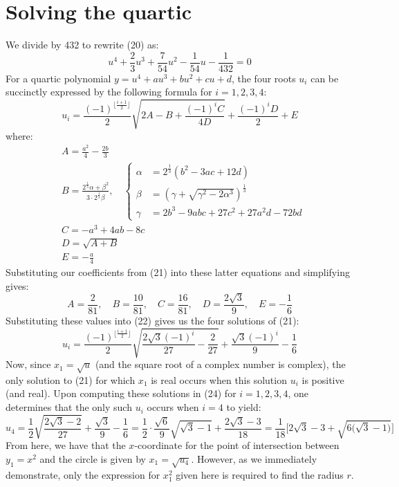 \documentclass{article}
\begin{document}
\section{Solving the quartic}
We divide by 432 to rewrite (20) as:
\begin{equation}
    \tag{21}u^4+\frac{2}{3}u^3+\frac{7}{54}u^2-\frac{1}{54}u-\frac{1}{432}=0
\end{equation}
\noindent For a quartic polynomial $y=u^4 + au^3+bu^2+cu+d$, the four roots $u_i$ can be succinctly expressed by the following formula for $i=1,2,3,4$:
\newline
\begin{equation}
  \tag{22}  u_i=\frac{(-1)^{\big\lfloor \frac{i+1}{2} \big\rfloor}}{2}\sqrt{2A-B+\frac{(-1)^iC}{4D}}+\frac{(-1)^iD}{2}+E
\end{equation}
\noindent where: 
\begin{align*}
    &A = \frac{a^2}{4} - \frac{2b}{3} \\
    &B = \frac{2^{\frac{1}{3}}\alpha + \beta^2}{3 \cdot 2^{\frac{1}{3}} \beta}, \quad
    \left\{
    \begin{aligned}
        \alpha &= 2^{\frac{1}{3}}(b^2 - 3ac + 12d) \\
        \beta &= \left(\gamma + \sqrt{\gamma^2 - 2\alpha^3}\right)^{\frac{1}{3}} \\
        \gamma &= 2b^3 - 9abc + 27c^2 + 27a^2d - 72bd
    \end{aligned}
    \right. \\
    &C = -a^3 + 4ab - 8c \\
    &D = \sqrt{A + B} \\
    &E = -\frac{a}{4}
\end{align*}
\noindent Substituting our coefficients from (21) into these latter equations and simplifying gives: 
\begin{equation*}
\tag{23} A = \frac{2}{81}, \quad B = \frac{10}{81}, \quad C = \frac{16}{81}, \quad D = \frac{2\sqrt{3}}{9}, \quad E = -\frac{1}{6}
\end{equation*}
\noindent Substituting these values into (22) gives us the four solutions of (21):
\begin{equation}
  \tag{24}  u_i=\frac{(-1)^{\big\lfloor \frac{i+1}{2} \big\rfloor}}{2}\sqrt{\frac{2\sqrt{3}(-1)^i}{27}-\frac{2}{27}}+\frac{\sqrt{3}(-1)^i}{9}-\frac{1}{6}
\end{equation}
Now, since $x_1=\sqrt{u}$ (and the square root of a complex number is complex), the only solution to (21) for which $x_1$ is real occurs when this solution $u_i$ is positive (and real). Upon computing these solutions in (24) for $i=1,2,3,4$, one determines that the only such $u_i$ occurs when $i=4$ to yield:
\begin{equation*}
    \tag{25} u_4=\frac{1}{2}\sqrt{\frac{2\sqrt{3}-2}{27}}+\frac{\sqrt{3}}{9}-\frac{1}{6}=\frac{1}{2}\cdot\frac{\sqrt{6}}{9}\sqrt{\sqrt{3}-1}+\frac{2\sqrt{3}-3}{18}= \frac{1}{18}\bigg[2\sqrt{3}-3+\sqrt{6\big(\sqrt{3}-1\big)}\bigg]
\end{equation*}
From here, we have that the $x$-coordinate for the point of intersection between $y_1=x^2$ and the circle is given by $x_1=\sqrt{u_4}$. However, as we immediately demonstrate, only the expression for $x_1^2$ given here is required to find the radius $r$.
\end{document}
